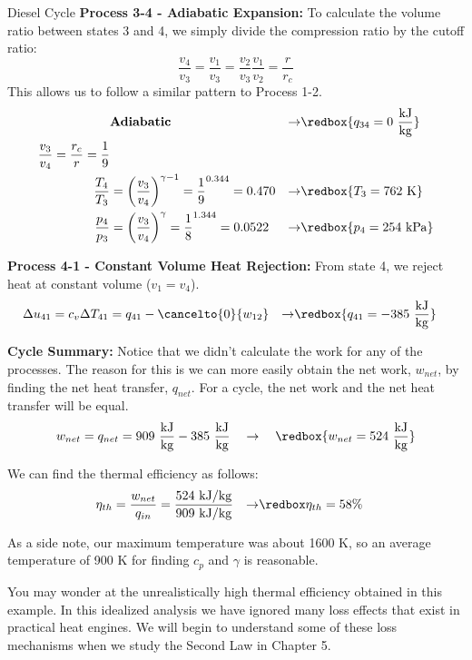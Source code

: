 \begin{example}[label=ex:ch3_diesel]{Diesel Cycle}
{\bf Process 3-4 - Adiabatic Expansion:}
To calculate the volume ratio between states 3 and 4, we simply divide the compression ratio by the cutoff ratio:
\begin{equation*}
  \frac{v_4}{v_3} = \frac{v_1}{v_3} = \frac{v_2}{v_3}\frac{v_1}{v_2} = \frac{r}{r_c}
\end{equation*}
This allows us to follow a similar pattern to Process 1-2.
\begin{align*}
  &{\rm \bf Adiabatic} &\rightarrow& \redbox{q_{34} = 0\ \frac{\rm kJ}{\rm kg}} \\
  \frac{v_3}{v_4} = \frac{r_c}{r}=\frac{1}{9} \\
  \frac{T_4}{T_3} &= \left(\frac{v_3}{v_4}\right)^{\gamma -1} = \frac{1}{9}^{0.344} = 0.470 &\rightarrow &\redbox{T_3 = 762\ {\rm K}} \\
  \frac{p_4}{p_3} &= \left(\frac{v_3}{v_4}\right)^{\gamma} = \frac{1}{8}^{1.344} = 0.0522 &\rightarrow &\redbox{p_4 = 254\ {\rm kPa}}
\end{align*}

{\bf Process 4-1 - Constant Volume Heat Rejection:}
From state 4, we reject heat at constant volume ($v_1 = v_4$).
\begin{align*}
  \Delta u_{41} &= c_v \Delta T_{41} = q_{41} - \cancelto{0}{w_{12}} &\rightarrow& \redbox{q_{41} = -385\ \frac{\rm kJ}{\rm kg}}
\end{align*}

{\bf Cycle Summary:} Notice that we didn't calculate the work for any of the processes.  The reason for this is we can more easily obtain the net work, $w_{net}$, by finding the net heat transfer, $q_{net}$.  For a cycle, the net work and the net heat transfer will be equal.
\begin{equation*}
  w_{net} = q_{net} = 909\ \frac{\rm kJ}{\rm kg} - 385\ \frac{\rm kJ}{\rm kg} \quad \rightarrow \quad \redbox{w_{net} = 524\ \frac{\rm kJ}{\rm kg}}
\end{equation*}

We can find the thermal efficiency as follows:
\begin{align*}
  \eta_{th} &= \frac{w_{net}}{q_{in}} = \frac{524\ {\rm kJ/kg}}{909\ {\rm kJ/kg}} &\rightarrow& \redbox{\eta_{th} = 58\%}
\end{align*}

As a side note, our maximum temperature was about 1600 K, so an average temperature of 900 K for finding $c_p$ and $\gamma$ is reasonable.

You may wonder at the unrealistically high thermal efficiency obtained in this example. In this idealized analysis we have ignored many loss effects that exist in practical heat engines. We will begin to understand some of these loss mechanisms when we study the Second Law in Chapter 5.
\end{example}

